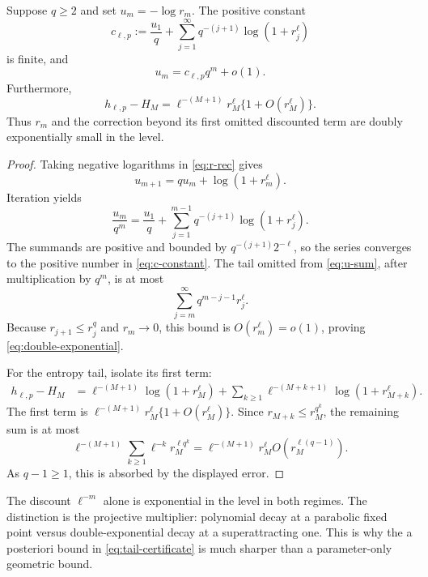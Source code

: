 \begin{theorem}
\label{thm:super}
Suppose $q\ge2$ and set $u_m=-\log r_m$.  The positive constant
\begin{equation}
 c_{\ell,p}:=\frac{u_1}{q}
 +\sum_{j=1}^{\infty}q^{-(j+1)}\log(1+r_j^\ell)
 \label{eq:c-constant}
\end{equation}
is finite, and
\begin{equation}
 u_m=c_{\ell,p}q^m+o(1).
 \label{eq:double-exponential}
\end{equation}
Furthermore,
\begin{equation}
 h_{\ell,p}-H_M
 =\ell^{-(M+1)}r_M^\ell\{1+O(r_M^\ell)\}.
 \label{eq:tail-super}
\end{equation}
Thus $r_m$ and the correction beyond its first omitted discounted term are
doubly exponentially small in the level.
\end{theorem}

\begin{proof}
Taking negative logarithms in \cref{eq:r-rec} gives
\begin{equation}
 u_{m+1}=qu_m+\log(1+r_m^\ell).
 \label{eq:u-rec}
\end{equation}
Iteration yields
\begin{equation}
 \frac{u_m}{q^m}=\frac{u_1}{q}
 +\sum_{j=1}^{m-1}q^{-(j+1)}\log(1+r_j^\ell).
 \label{eq:u-sum}
\end{equation}
The summands are positive and bounded by $q^{-(j+1)}2^{-\ell}$, so the
series converges to the positive number in \cref{eq:c-constant}.  The tail
omitted from \cref{eq:u-sum}, after multiplication by $q^m$, is at most
\[
 \sum_{j=m}^{\infty}q^{m-j-1}r_j^\ell.
\]
Because $r_{j+1}\le r_j^q$ and $r_m\to0$, this bound is
$O(r_m^\ell)=o(1)$, proving \cref{eq:double-exponential}.

For the entropy tail, isolate its first term:
\begin{align*}
 h_{\ell,p}-H_M
 &=\ell^{-(M+1)}\log(1+r_M^\ell)
 +\sum_{k\ge1}\ell^{-(M+k+1)}\log(1+r_{M+k}^\ell).
\end{align*}
The first term is
$\ell^{-(M+1)}r_M^\ell\{1+O(r_M^\ell)\}$.
Since $r_{M+k}\le r_M^{q^k}$, the remaining sum is at most
\[
 \ell^{-(M+1)}\sum_{k\ge1}\ell^{-k}r_M^{\ell q^k}
 =\ell^{-(M+1)}r_M^\ell O(r_M^{\ell(q-1)}).
\]
As $q-1\ge1$, this is absorbed by the displayed error.
\end{proof}

\begin{remark}
The discount $\ell^{-m}$ alone is exponential in the level in both regimes.
The distinction is the projective multiplier: polynomial decay at a
parabolic fixed point versus double-exponential decay at a superattracting
one.  This is why the a posteriori bound in \cref{eq:tail-certificate} is
much sharper than a parameter-only geometric bound.
\end{remark}

